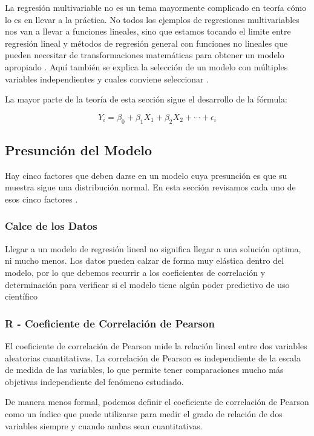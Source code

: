 \begin{spacing}{1.5}
La regresión multivariable no es un tema mayormente complicado en teoría cómo lo es en llevar a la práctica. No todos los ejemplos de regresiones multivariables nos van a llevar a funciones lineales, sino que estamos tocando el limite entre regresión lineal y métodos de regresión general con funciones no lineales que pueden necesitar de transformaciones matemáticas para obtener un modelo apropiado \cite{daroczi}. Aquí también se explica la selección de un modelo con múltiples variables independientes y cuales conviene seleccionar \cite{viswanathan}.

La mayor parte de la teoría de esta sección sigue el desarrollo de la fórmula:

\[Y_{i} = \beta_{0} + \beta_{1}X_{1} + \beta_{2}X_{2} + \cdots + \epsilon_{i}\]

\subsection{Presunción del Modelo}
Hay cinco factores que deben darse en un modelo cuya presunción es que su muestra sigue una distribución normal. En esta sección revisamos cada uno de esos cinco factores \cite{daroczi}.

\subsubsection{Calce de los Datos}
Llegar a un modelo de regresión lineal no significa llegar a una solución optima, ni mucho menos. Los datos pueden calzar de forma muy elástica dentro del modelo, por lo que debemos recurrir a los coeficientes de correlación y determinación para verificar si el modelo tiene algún poder predictivo de uso científico

\subsubsection{R - Coeficiente de Correlación de Pearson}
El coeficiente de correlación de Pearson mide la relación lineal entre dos variables aleatorias cuantitativas. La correlación de Pearson es independiente de la escala de medida de las variables, lo que permite tener comparaciones mucho más objetivas independiente del fenómeno estudiado.

De manera menos formal, podemos definir el coeficiente de correlación de Pearson como un índice que puede utilizarse para medir el grado de relación de dos variables siempre y cuando ambas sean cuantitativas.


\end{spacing}
